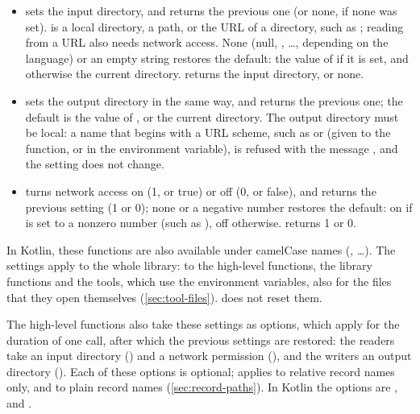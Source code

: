 \begin{itemize}
\item {} sets the input directory, and returns
  the previous one (or none, if none was set).  is a local
  directory, a \code{\textasciitilde} path, or the URL of a directory, such
  as ; reading from a URL also
  needs network access. None (null, , \ldots, depending on the
  language) or an empty string restores the default: the value of
   if it is set, and otherwise the current directory.
   returns the input directory, or none.
\item {} sets the output directory in the
  same way, and returns the previous one; the default is the value of
  , or the current directory. The output directory
  must be local: a name that begins with a URL scheme, such as
   or  (given to the function, or in the
  environment variable), is refused with the message
  , and the setting does not change.
\item {} turns network access on (1, or true) or
  off (0, or false), and returns the previous setting (1 or 0); none or a
  negative number restores the default: on if  is set
  to a nonzero number (such as ), off otherwise.
   returns 1 or 0.
\end{itemize}
In Kotlin, these functions are also available under camelCase names
(, \ldots). The settings apply to the whole library:
to the high-level functions, the library functions and the tools, which use
the environment variables, also for the files that they open themselves
(\cref{sec:tool-files}).  does not reset them.

The high-level functions also take these settings as options, which apply
for the duration of one call, after which the previous settings are
restored: the readers take an input directory () and a
network permission (), and the writers an output directory
(). Each of these options is optional;  applies
to relative record names only, and  to plain record names
(\cref{sec:record-paths}). In Kotlin the options are ,
 and .

